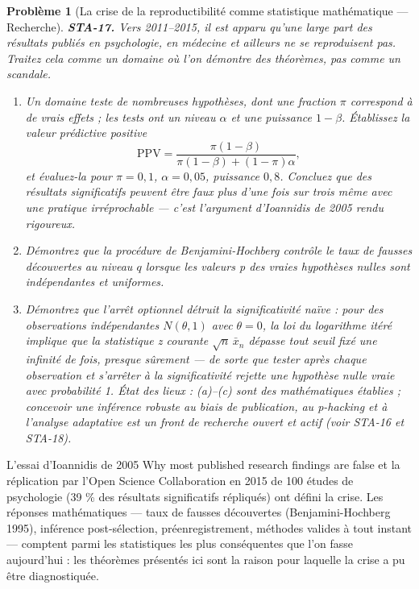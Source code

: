 \documentclass[11pt]{article}
\newtheorem{problem}{Problème}
\begin{document}
\bigskip

\begin{problem}[{La crise de la reproductibilité comme statistique mathématique --- Recherche}]
\textbf{STA-17.} Vers 2011--2015, il est apparu qu'une large part des résultats publiés en
psychologie, en médecine et ailleurs ne se reproduisent pas. Traitez cela comme un domaine où l'on
démontre des théorèmes, pas comme un scandale.
\begin{enumerate}
\item[(a)] Un domaine teste de nombreuses hypothèses, dont une fraction $ \pi $ correspond à de vrais
effets ; les tests ont un niveau $ \alpha $ et une puissance $ 1 - \beta $. Établissez la valeur
prédictive positive
\[ \mathrm{PPV} = \frac{\pi (1-\beta)}{\pi (1-\beta) + (1-\pi)\alpha} , \]
et évaluez-la pour $ \pi = 0{,}1 $, $ \alpha = 0{,}05 $, puissance $ 0{,}8 $. Concluez que des
résultats \og{} significatifs \fg{} peuvent être faux plus d'une fois sur trois même avec une pratique
irréprochable --- c'est l'argument d'Ioannidis de 2005 rendu rigoureux.
\item[(b)] Démontrez que la procédure de Benjamini-Hochberg contrôle le taux de fausses découvertes au
niveau $ q $ lorsque les valeurs p des vraies hypothèses nulles sont indépendantes et
uniformes.
\item[(c)] Démontrez que l'arrêt optionnel détruit la significativité naïve : pour des observations
indépendantes $ N(\theta, 1) $ avec $ \theta = 0 $, la loi du logarithme itéré implique que la
statistique z courante $ \sqrt{n}\, \bar{x}_n $ dépasse tout seuil fixé une infinité de fois,
presque sûrement --- de sorte que \og{} tester après chaque observation et s'arrêter à la significativité \fg{}
rejette une hypothèse nulle vraie avec probabilité 1.
\textit{État des lieux : (a)--(c) sont des mathématiques établies ; concevoir une inférence robuste au
biais de publication, au p-hacking et à l'analyse adaptative est un front de recherche ouvert et
actif (voir STA-16 et STA-18).}
\end{enumerate}

\end{problem}

\noindent L'essai d'Ioannidis de 2005 \og{} Why most published research findings are false \fg{}
et la réplication par l'Open Science Collaboration en 2015 de 100 études de psychologie (39 \% des
résultats significatifs répliqués) ont défini la crise. Les réponses mathématiques --- taux de fausses
découvertes (Benjamini-Hochberg 1995), inférence post-sélection, préenregistrement, méthodes
valides à tout instant --- comptent parmi les statistiques les plus conséquentes que l'on fasse
aujourd'hui : les théorèmes présentés ici sont la raison pour laquelle la crise a pu être
diagnostiquée.
\end{document}

